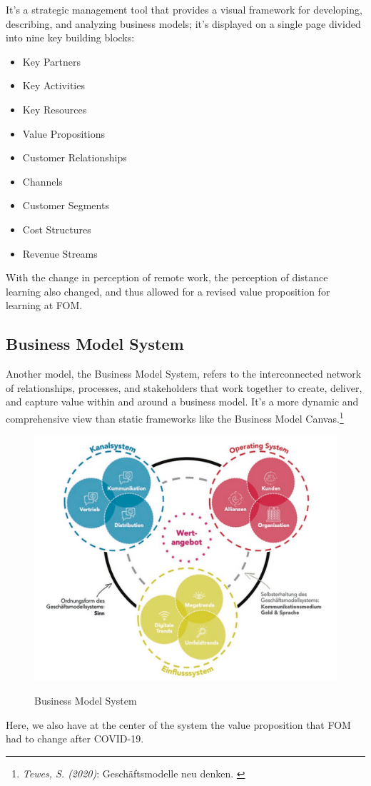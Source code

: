 It's a strategic management tool that provides a visual framework for developing, describing, and analyzing business models; it's displayed on a single page divided into nine key building blocks:

\begin{itemize}
    \item Key Partners
    \item Key Activities
    \item Key Resources
    \item Value Propositions
    \item Customer Relationships
    \item Channels
    \item Customer Segments
    \item Cost Structures
    \item Revenue Streams
\end{itemize}

With the change in perception of remote work, the perception of distance learning also changed, and thus allowed for a revised value proposition for learning at FOM.

\subsection{Business Model System}

Another model, the Business Model System,  refers to the interconnected network of relationships, processes, and stakeholders that work together to create, deliver, and capture value within and around a business model. It's a more dynamic and comprehensive view than static frameworks like the Business Model Canvas.\footnote{\textit{Tewes, S. (2020)}: Geschäftsmodelle neu denken. \cite{zukunft}} 

\begin{figure}[H]
\centering
\caption {Business Model System}
\includegraphics[width=\linewidth]{images/business-model-system.png}
\label{fig:businessModelSystem}
\end{figure}

Here, we also have at the center of the system the value proposition that FOM had to change after COVID-19.
